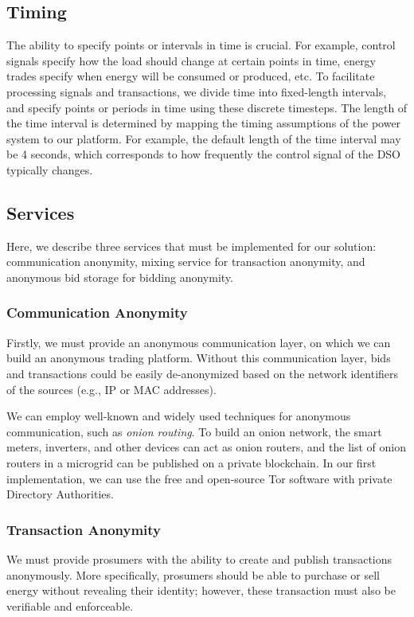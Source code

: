\subsection{Timing}
The ability to specify points or intervals in time is crucial.
For example, control signals specify how the load should change at certain points in time, energy trades specify when energy will be consumed or produced, etc.
To facilitate processing signals and transactions, we divide time into fixed-length intervals, and specify points or periods in time using these discrete timesteps.
The length of the time interval is determined by mapping the timing assumptions of the power system to our platform.
For example, the default length of the time interval may be 4 seconds, which corresponds to how frequently the control signal of the DSO typically changes.

\subsection{Services}

Here, we describe three services that must be implemented for our solution: communication anonymity, mixing service for transaction anonymity, and anonymous bid storage for bidding anonymity.

\subsubsection{Communication Anonymity}
Firstly, we must provide an anonymous communication layer, on which we can build an anonymous trading platform.
Without this communication layer, bids and transactions could be easily de-anonymized based on the network identifiers of the sources (e.g., IP or MAC addresses).

We can employ well-known and widely used techniques for anonymous communication, such as \emph{onion routing}.
To build an onion network, the smart meters, inverters, and other devices can act as onion routers, and the list of onion routers in a microgrid can be published on a private blockchain.
In our first implementation, we can use the free and open-source Tor software with private Directory Authorities.

\subsubsection{Transaction Anonymity}
We must provide prosumers with the ability to create and publish transactions anonymously.
More specifically, prosumers should be able to purchase or sell energy without revealing their identity; however, these transaction must also be verifiable and enforceable.

